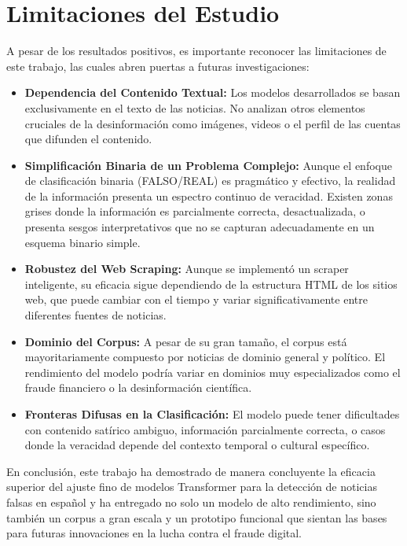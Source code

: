 \section{Limitaciones del Estudio}
A pesar de los resultados positivos, es importante reconocer las limitaciones de este trabajo, las cuales abren puertas a futuras investigaciones:
\begin{itemize}
    \item \textbf{Dependencia del Contenido Textual:} Los modelos desarrollados se basan exclusivamente en el texto de las noticias. No analizan otros elementos cruciales de la desinformación como imágenes, videos o el perfil de las cuentas que difunden el contenido.
    
    \item \textbf{Simplificación Binaria de un Problema Complejo:} Aunque el enfoque de clasificación binaria (FALSO/REAL) es pragmático y efectivo, la realidad de la información presenta un espectro continuo de veracidad. Existen zonas grises donde la información es parcialmente correcta, desactualizada, o presenta sesgos interpretativos que no se capturan adecuadamente en un esquema binario simple.
    
    \item \textbf{Robustez del Web Scraping:} Aunque se implementó un scraper inteligente, su eficacia sigue dependiendo de la estructura HTML de los sitios web, que puede cambiar con el tiempo y variar significativamente entre diferentes fuentes de noticias.
    
    \item \textbf{Dominio del Corpus:} A pesar de su gran tamaño, el corpus está mayoritariamente compuesto por noticias de dominio general y político. El rendimiento del modelo podría variar en dominios muy especializados como el fraude financiero o la desinformación científica.
    
    \item \textbf{Fronteras Difusas en la Clasificación:} El modelo puede tener dificultades con contenido satírico ambiguo, información parcialmente correcta, o casos donde la veracidad depende del contexto temporal o cultural específico.
\end{itemize}

En conclusión, este trabajo ha demostrado de manera concluyente la eficacia superior del ajuste fino de modelos Transformer para la detección de noticias falsas en español y ha entregado no solo un modelo de alto rendimiento, sino también un corpus a gran escala y un prototipo funcional que sientan las bases para futuras innovaciones en la lucha contra el fraude digital.